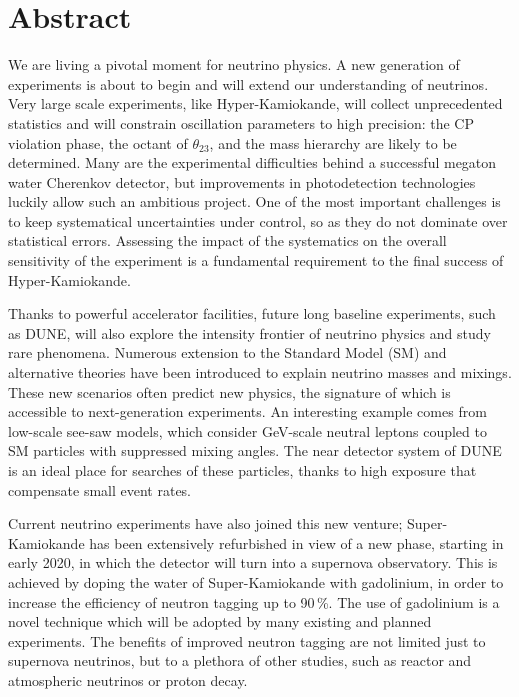 \clearpage

\section*{Abstract}

We are living a pivotal moment for neutrino physics.
A new generation of experiments is about to begin and will extend our understanding of neutrinos. %
Very large scale experiments, like Hyper-Kamiokande, will collect unprecedented statistics and %
will constrain oscillation parameters to high precision: the CP violation phase, the octant of $\theta_{23}$, %
and the mass hierarchy are likely to be determined.
Many are the experimental difficulties behind a successful megaton water Cherenkov detector, %
but improvements in photodetection technologies luckily allow such an ambitious project.
One of the most important challenges is to keep systematical uncertainties under control, %
so as they do not dominate over statistical errors.
Assessing the impact of the systematics on the overall sensitivity of the experiment is a fundamental requirement %
to the final success of Hyper-Kamiokande.

Thanks to powerful accelerator facilities, future long baseline experiments, such as DUNE, will also explore %
the intensity frontier of neutrino physics and study rare phenomena.
Numerous extension to the Standard Model (SM) and alternative theories have been introduced to %
explain neutrino masses and mixings.
These new scenarios often predict new physics, the signature of which is accessible to next-generation experiments.
An interesting example comes from low-scale see-saw models, which consider GeV-scale neutral leptons %
coupled to SM particles with suppressed mixing angles.
The near detector system of DUNE is an ideal place for searches of these particles, %
thanks to high exposure that compensate small event rates.

Current neutrino experiments have also joined this new venture; %
Super-Kamiokande has been extensively refurbished in view of a new phase, starting in early 2020, %
in which the detector will turn into a supernova observatory.
This is achieved by doping the water of Super-Kamiokande with gadolinium, %
in order to increase the efficiency of neutron tagging up to 90\,\%.
The use of gadolinium is a novel technique which will be adopted by many existing and planned experiments.
The benefits of improved neutron tagging are not limited just to supernova neutrinos, but %
to a plethora of other studies, such as reactor and atmospheric neutrinos or proton decay.

